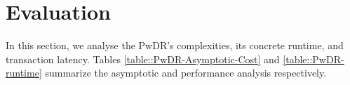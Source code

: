 

\vspace{-1mm}
\section{Evaluation}\label{sec::eval-}
\vspace{-1.5 mm}
In this section, we analyse the PwDR's complexities, its concrete runtime, and transaction latency.  Tables \ref{table::PwDR-Asymptotic-Cost} and \ref{table::PwDR-runtime} summarize the asymptotic and performance analysis respectively. 












